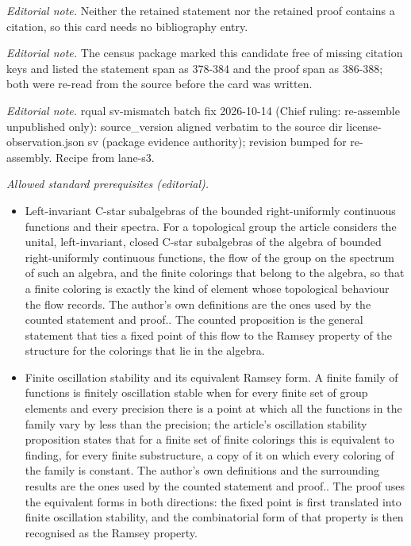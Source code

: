 \documentclass[10pt,a4paper]{article}
\theoremstyle{definition}
\numberwithin{equation}{section}
\numberwithin{figure}{section}
\numberwithin{table}{section}
\begin{document}
\noindent\textit{Editorial note.} Neither the retained statement nor the retained proof contains a citation, so this card needs no bibliography entry.\par\medskip
\noindent\textit{Editorial note.} The census package marked this candidate free of missing citation keys and listed the statement span as 378-384 and the proof span as 386-388; both were re-read from the source before the card was written.\par\medskip
\noindent\textit{Editorial note.} rqual sv-mismatch batch fix 2026-10-14 (Chief ruling: re-assemble unpublished only): source\_version aligned verbatim to the source dir license-observation.json sv (package evidence authority); revision bumped for re-assembly. Recipe from lane-s3.\par\medskip
\noindent\textit{Allowed standard prerequisites (editorial).}\begin{itemize}
\item Left-invariant C-star subalgebras of the bounded right-uniformly continuous functions and their spectra. For a topological group the article considers the unital, left-invariant, closed C-star subalgebras of the algebra of bounded right-uniformly continuous functions, the flow of the group on the spectrum of such an algebra, and the finite colorings that belong to the algebra, so that a finite coloring is exactly the kind of element whose topological behaviour the flow records. The author's own definitions are the ones used by the counted statement and proof.. The counted proposition is the general statement that ties a fixed point of this flow to the Ramsey property of the structure for the colorings that lie in the algebra.
\item Finite oscillation stability and its equivalent Ramsey form. A finite family of functions is finitely oscillation stable when for every finite set of group elements and every precision there is a point at which all the functions in the family vary by less than the precision; the article's oscillation stability proposition states that for a finite set of finite colorings this is equivalent to finding, for every finite substructure, a copy of it on which every coloring of the family is constant. The author's own definitions and the surrounding results are the ones used by the counted statement and proof.. The proof uses the equivalent forms in both directions: the fixed point is first translated into finite oscillation stability, and the combinatorial form of that property is then recognised as the Ramsey property.
\end{itemize}\medskip
\end{document}
